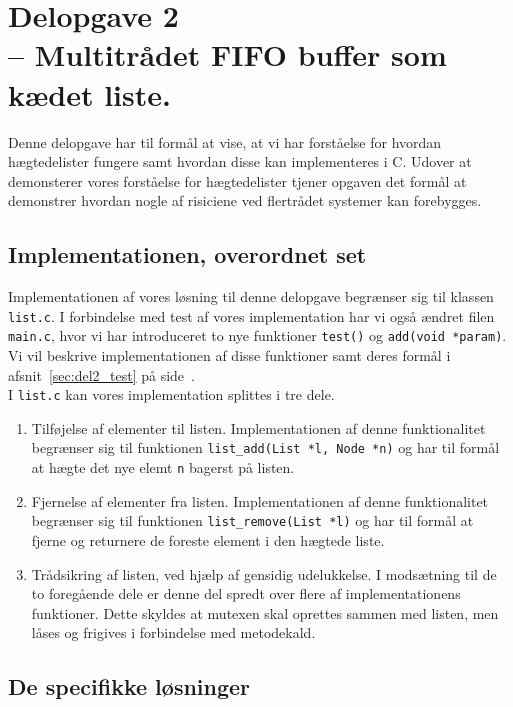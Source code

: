 \documentclass[main.tex]{subfile}
\begin{document}
\section{Delopgave 2\\\normalsize{-- Multitrådet FIFO buffer som kædet liste.}}
Denne delopgave har til formål at vise, at vi har forståelse for hvordan hægtedelister fungere samt hvordan disse kan implementeres i C. Udover at demonsterer vores forståelse for hægtedelister tjener opgaven det formål at demonstrer hvordan nogle af risiciene ved flertrådet systemer kan forebygges.

\subsection{Implementationen, overordnet set}
Implementationen af vores løsning til denne delopgave begrænser sig til klassen \texttt{list.c}. I forbindelse med test af vores implementation har vi også ændret filen \texttt{main.c}, hvor vi har introduceret to nye funktioner \texttt{test()} og \texttt{add(void *param)}. Vi vil beskrive implementationen af disse funktioner samt deres formål i afsnit~\ref{sec:del2_test} på side~\pageref{sec:del2_test}.\\

I \texttt{list.c} kan vores implementation splittes i tre dele.
\begin{enumerate}
\item Tilføjelse af elementer til listen. Implementationen af denne funktionalitet begrænser sig til funktionen \texttt{list\_add(List *l, Node *n)} og har til formål at hægte det nye elemt \texttt{n} bagerst på listen.
\item Fjernelse af elementer fra listen. Implementationen af denne funktionalitet begrænser sig til funktionen \texttt{list\_remove(List *l)} og har til formål at fjerne og returnere de foreste element i den hægtede liste.
\item Trådsikring af listen, ved hjælp af gensidig udelukkelse. I modsætning til de to foregående dele er denne del spredt over flere af implementationens funktioner. Dette skyldes at mutexen skal oprettes sammen med listen, men låses og frigives i forbindelse med metodekald.  
\end{enumerate}

\subsection{De specifikke løsninger}
\end{document}
